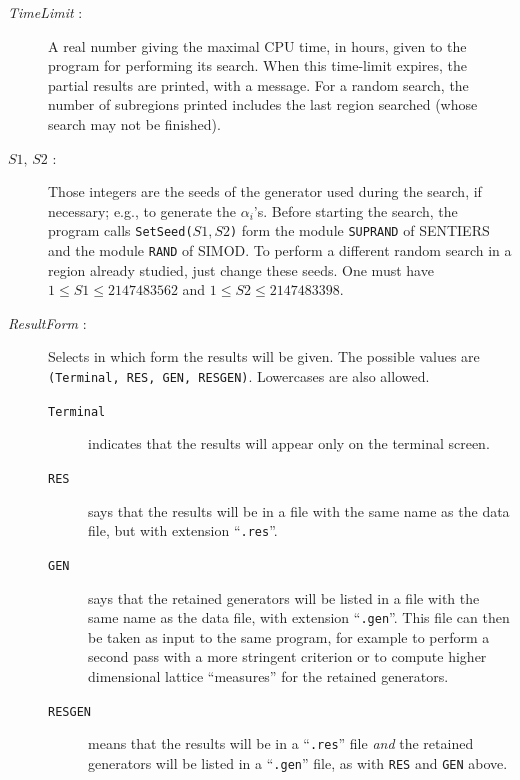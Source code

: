 \begin {description}
%
\item [{\em TimeLimit} :]
  A real number giving the maximal CPU time, in hours, given to the program
  for performing its search.
  When this time-limit expires, the partial results are printed, with a message.
  For a random search, the number of subregions printed includes
  the last region searched (whose search may not be finished).
%
\item [$S1,\, S2$ :]
  Those integers are the seeds of the generator used during the
  search, if necessary; e.g., to generate the $\alpha_i$'s.
  Before starting the search, the program calls
  {\tt SetSeed($S1, S2$)} form the module {\tt SUPRAND} of SENTIERS
  and the module {\tt RAND} of SIMOD.
  To perform a different random search in a region already studied,
  just change these seeds.
  One must have $1\le S1\le 2147483562$ and $1\le S2\le 2147483398$.
%
\item [{\em ResultForm} :]
  Selects in which form the results will be given.
  The possible values are {\tt (Terminal, RES, GEN, RESGEN)}.
  Lowercases are also allowed.
  \begin {description}
   \item [{\tt Terminal}] indicates that the results will appear only on the
     terminal screen.
   \item [{\tt RES}] says that the results will be in a file with the same
     name as the data file, but with extension ``{\tt .res}''.
   \item [{\tt GEN}] says that the retained generators will be listed in
     a file with the same name as the data file, with extension ``{\tt .gen}''.
     This file can then be taken as input to the same program, for
     example to perform a second pass with a more stringent criterion
     or to compute higher dimensional lattice ``measures'' for the
     retained generators.
   \item [{\tt RESGEN}] means that the results will be in a ``{\tt .res}''
     file {\em and} the retained generators will be listed in a ``{\tt .gen}''
     file, as with {\tt RES} and {\tt GEN} above.
  \end {description}
\end {description}

